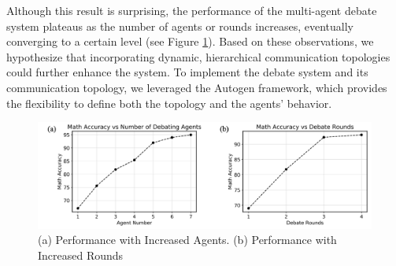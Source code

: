 Although this result is surprising, the performance of the multi-agent debate system plateaus as the number of agents or rounds increases, eventually converging to a certain level (see Figure \ref{fig:performance_with_increased}). Based on these observations, we hypothesize that incorporating dynamic, hierarchical communication topologies could further enhance the system. To implement the debate system and its communication topology, we leveraged the Autogen framework\cite{microsoft_autogen}, which provides the flexibility to define both the topology and the agents’ behavior.
\begin{figure}
    \centering
    \includegraphics[width=0.85\linewidth]{img/section_background/performance_with_increased.png}
    \caption{(a) Performance with Increased Agents. (b) Performance with Increased Rounds}
    \label{fig:performance_with_increased}
\end{figure}
